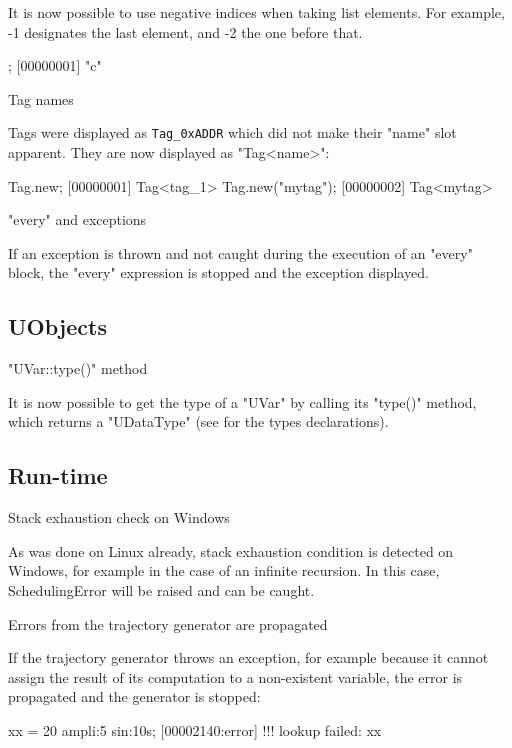 \begin{description}
It is now possible to use negative indices when taking list elements.
For example, -1 designates the last element, and -2 the one before that.

\begin{urbiscript}
["a", "b", "c"][-1];
[00000001] "c"
\end{urbiscript}

\item Tag names

  Tags were displayed as \lstinline|Tag_0xADDR| which did not make
  their "name" slot apparent. They are now displayed as "Tag<name>":

\begin{urbiscript}
Tag.new;
[00000001] Tag<tag_1>
Tag.new("mytag");
[00000002] Tag<mytag>
\end{urbiscript}

\item "every" and exceptions

If an exception is thrown and not caught during the execution of an "every"
block, the "every" expression is stopped and the exception displayed.
\end{description}

\subsection{UObjects}
\begin{description}
\item "UVar::type()" method

It is now possible to get the type of a "UVar" by calling its "type()"
method, which returns a "UDataType" (see  for the
types declarations).
\end{description}

\subsection{Run-time}
\begin{description}
\item Stack exhaustion check on Windows

  As was done on Linux already, stack exhaustion condition is detected on
  Windows, for example in the case of an infinite recursion. In this case,
  SchedulingError will be raised and can be caught.

\item Errors from the trajectory generator are propagated

  If the trajectory generator throws an exception, for example because it
  cannot assign the result of its computation to a non-existent variable,
  the error is propagated and the generator is stopped:

\begin{urbiunchecked}
xx = 20 ampli:5 sin:10s;
[00002140:error] !!! lookup failed: xx
\end{urbiunchecked}
\end{description}

